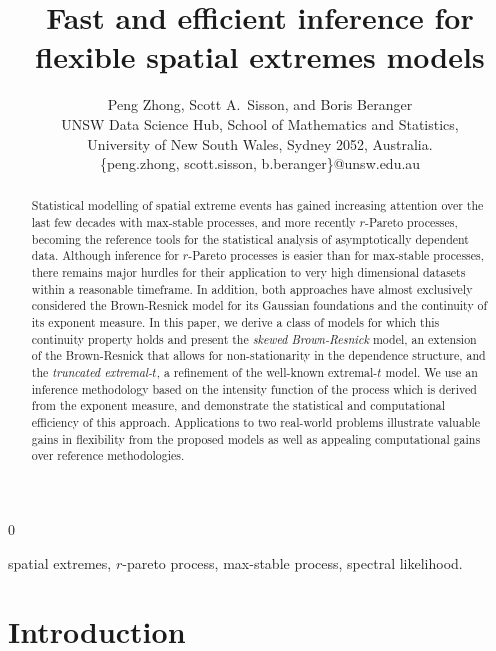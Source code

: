 \documentclass[12pt]{article}
\newcommand{\blind}{0}
\begin{document}
\title{\bf Fast and efficient inference for flexible spatial extremes models}
\blind{
  \author{Peng Zhong, Scott A.~Sisson, and Boris Beranger \\ 
  UNSW Data Science Hub, School of Mathematics and Statistics,\\ University of New South Wales, Sydney 2052, Australia. \\
  \{peng.zhong, scott.sisson, b.beranger\}@unsw.edu.au}
  \maketitle
} \fi

\baselineskip=25pt
\begin{abstract}
    Statistical modelling of spatial extreme events has gained increasing attention over the last few decades with max-stable processes, and more recently $r$-Pareto processes, becoming the reference tools for the statistical analysis of asymptotically dependent data. Although inference for $r$-Pareto processes is easier than for max-stable processes, there remains major hurdles for their application to very high dimensional datasets within a reasonable timeframe. In addition, both approaches have almost exclusively considered the Brown-Resnick model for its Gaussian foundations and the continuity of its exponent measure. In this paper, we derive a class of models for which this continuity property holds and present the \emph{skewed Brown-Resnick} model, an extension of the Brown-Resnick that allows for non-stationarity in the dependence structure, and the \emph{truncated extremal-$t$}, a refinement of the well-known extremal-$t$ model. We use an inference methodology based on the intensity function of the process which is derived from the exponent measure, and demonstrate the statistical and computational efficiency of this approach. Applications to two real-world problems illustrate valuable gains in flexibility from the proposed models as well as appealing computational gains over reference methodologies. 
\end{abstract}

  spatial extremes, $r$-pareto process, max-stable process, spectral likelihood.

\baselineskip=25pt

\section{Introduction}
\end{document}
